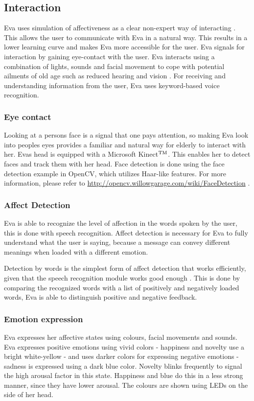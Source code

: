 \documentclass[project_eva.tex]{subfiles}
\begin{document}
\subsection*{Interaction}
Eva uses simulation of affectiveness as a clear non-expert way of interacting \cite{Thomaz} . This allows the user to communicate with Eva in a natural way.  This results in a lower learning curve and makes Eva more accessible for the user. Eva signals for interaction by gaining eye-contact with the user. Eva interacts using a combination of lights, sounds and facial movement to cope with potential ailments of old age  such as reduced hearing and vision . For receiving and understanding information from the user, Eva uses keyword-based voice recognition. 

\subsubsection*{Eye contact}
Looking at a person\textquotesingle s face is a signal that one pays attention, so making Eva look into 
people\textquotesingle s eyes provides a familiar and natural way for elderly to interact with her. 
Eva\textquotesingle s head is equipped with a Microsoft Kinect$\rm {}^{TM}$. This enables her to detect faces and track them with her head.  Face detection is done using the face detection example in OpenCV, which utilizes Haar-like features. 
For more information, please refer to \url{http://opencv.willowgarage.com/wiki/FaceDetection} \cite{FaceDetection} .

\subsubsection*{Affect Detection}
Eva is able to recognize the level of affection in the words spoken by the user, this is done with speech recognition. Affect detection is necessary for Eva to fully understand what the user is saying, because a message can convey different meanings when loaded with a different emotion.

Detection by words is the simplest form of affect detection that works efficiently, given that the speech recognition module works good enough \cite{affection} . This is done by comparing the recognized words with a list of positively and negatively loaded words, Eva is able to distinguish positive and negative feedback.
 
\subsubsection*{Emotion expression}
\label{sec:Emotion expression}
Eva expresses her affective states using colours, facial movements and sounds. Eva expresses positive emotions using vivid colors - happiness and novelty use a bright white-yellow - and uses darker colors for expressing negative emotions - sadness is expressed using a dark blue color. \cite{Chris} \cite{Zentner} Novelty blinks frequently to signal the high arousal factor in this state. Happiness and blue do this in a less strong manner, since they have lower arousal. The colours are shown using LEDs on the side of her head. 
\end{document}
